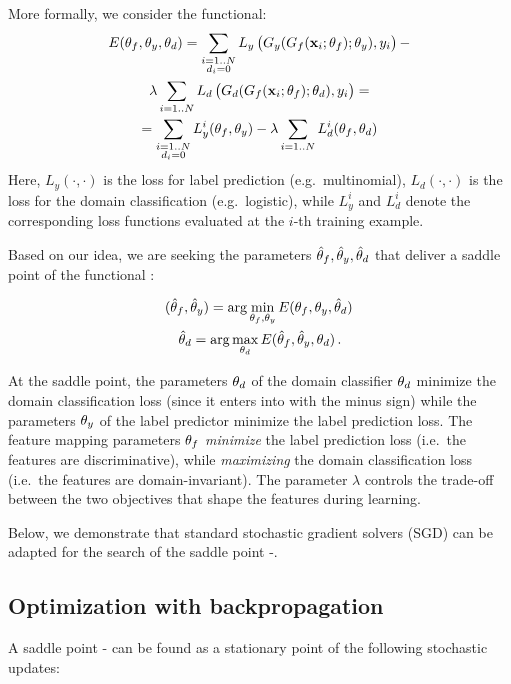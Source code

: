 More formally, we consider the functional:
\begin{gather} 
E({\theta_f},{\theta_y},{\theta_d}) =  \sum_{\substack{i=1..N\\d_i = 0}} L_y\left( \strut G_y(G_f({\mathbf x}_i;{\theta_f});{\theta_y}), y_i\right) -\nonumber\\ \lambda \sum_{i=1..N} L_d \left( \strut G_d(G_f({\mathbf x}_i;{\theta_f});{\theta_d}), y_i\right) = \nonumber\\= \sum_{\substack{i=1..N\\d_i = 0}} L^i_y( {\theta_f}, {\theta_y}) - \lambda \sum_{i=1..N} L^i_d( {\theta_f}, {\theta_d}) 
\label{eq:func}
\end{gather}
Here, $L_y(\cdot,\cdot)$ is the loss for label prediction (e.g.\ multinomial), $L_d(\cdot,\cdot)$ is the loss for the domain classification (e.g.\ logistic), while $L^i_y$ and $L^i_d$ denote the corresponding loss functions evaluated at the $i$-th training example. 

Based on our idea, we are seeking the parameters ${\hat\theta_f},{\hat\theta_y},{\hat\theta_d}$ that deliver a saddle point of the functional :

\begin{gather}
({\hat\theta_f},{\hat\theta_y}) = \arg\min_{{\theta_f},{\theta_y}} E({\theta_f},{\theta_y},{\hat\theta_d})\,\label{eq:opt1}\\\label{eq:opt2}
{\hat\theta_d} = \arg\max_{\theta_d} E({\hat\theta_f},{\hat\theta_y}, {\theta_d})\,.
\end{gather}

At the saddle point, the parameters ${\theta_d}$ of the domain classifier ${\theta_d}$ minimize the domain classification loss (since it enters into  with the minus sign) while the parameters ${\theta_y}$ of the label predictor minimize the label prediction loss. The feature mapping parameters ${\theta_f}$ {\em minimize} the label prediction loss (i.e.\ the features are discriminative), while {\em maximizing} the domain classification loss (i.e.\ the features are domain-invariant). The parameter $\lambda$ controls the trade-off between the two objectives that shape the features during learning.

Below, we demonstrate that standard stochastic gradient solvers (SGD) can be adapted for the search of the saddle point -.

\subsection{Optimization with backpropagation}

A saddle point - can be found as a stationary point of the following stochastic updates:

